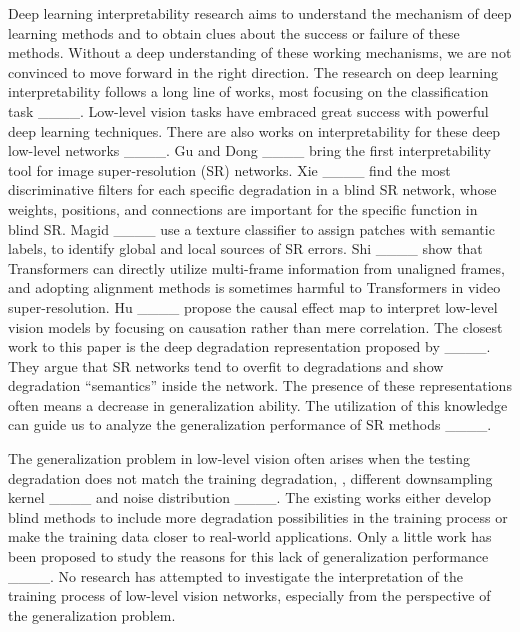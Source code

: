 Deep learning interpretability research aims to understand the mechanism of deep learning methods and to obtain clues about the success or failure of these methods.
%
Without a deep understanding of these working mechanisms, we are not convinced to move forward in the right direction.
%
The research on deep learning interpretability follows a long line of works, most focusing on the classification task ____.
%
Low-level vision tasks have embraced great success with powerful deep learning techniques.
%
There are also works on interpretability for these deep low-level networks ____.
%
Gu and Dong ____ bring the first interpretability tool for image super-resolution (SR) networks.
%
Xie \etal ____ find the most discriminative filters for each specific degradation in a blind SR network, whose weights, positions, and connections are important for the specific function in blind SR.
%
Magid \etal ____ use a texture classifier to assign patches with semantic labels, to identify global and local sources of SR errors.
%
Shi \etal ____ show that Transformers can directly utilize multi-frame information from unaligned frames, and adopting alignment methods is sometimes harmful to Transformers in video super-resolution.
%
Hu \etal ____ propose the causal effect map to interpret low-level vision models by focusing on causation rather than mere correlation.
%
The closest work to this paper is the deep degradation representation proposed by ____.
%
They argue that SR networks tend to overfit to degradations and show degradation ``semantics'' inside the network.
%
The presence of these representations often means a decrease in generalization ability.
%
The utilization of this knowledge can guide us to analyze the generalization performance of SR methods ____.

The generalization problem in low-level vision often arises when the testing degradation does not match the training degradation, \eg, different downsampling kernel ____ and noise distribution ____.
%
The existing works either develop blind methods to include more degradation possibilities in the training process or make the training data closer to real-world applications.
%
Only a little work has been proposed to study the reasons for this lack of generalization performance ____.
%
No research has attempted to investigate the interpretation of the training process of low-level vision networks, especially from the perspective of the generalization problem.